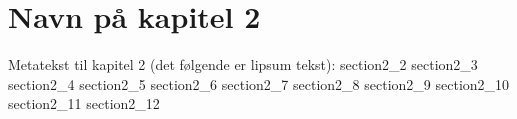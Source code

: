 \documentclass[class=report, crop=false]{standalone}
\begin{document}
    \chapter{Navn på kapitel 2}
    Metatekst til kapitel 2 (det følgende er lipsum tekst): 
    {section2_2}
    {section2_3}
    {section2_4}
    {section2_5}
    \newpage
    {section2_6}
    \newpage
    {section2_7}
    {section2_8}
    {section2_9}
    \newpage
    {section2_10}
    {section2_11}
    {section2_12}
\end{document}
